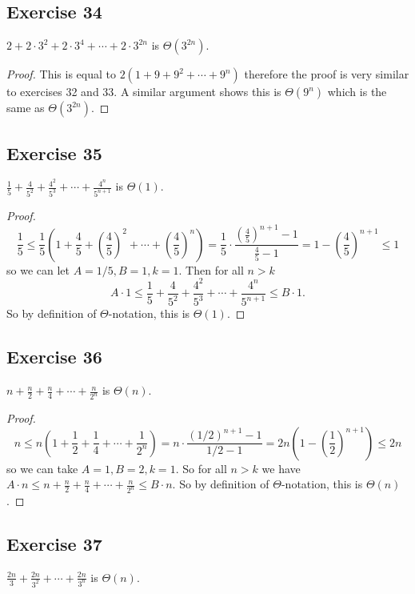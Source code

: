 \documentclass[14pt]{extarticle}
\newcommand{\dps}{\displaystyle}
\begin{document}
\subsection{Exercise 34}
\(2 + 2 \cdot 3^2 + 2 \cdot 3^4 + \cdots + 2 \cdot 3^{2n}\) is \(\Theta(3^{2n})\).

\begin{proof}
    This is equal to \(2(1 + 9 + 9^2 + \cdots + 9^n)\) therefore the proof is very similar to exercises 32 and 33. A similar
    argument shows this is \(\Theta(9^n)\) which is the same as \(\Theta(3^{2n})\).
\end{proof}

\subsection{Exercise 35}
\(\dps \frac{1}{5} + \frac{4}{5^2} + \frac{4^2}{5^3} + \cdots + \frac{4^n}{5^{n+1}}\) is \(\Theta(1)\).

\begin{proof}
    \[
        \frac{1}{5} \leq \frac{1}{5}\left(1 + \frac{4}{5}+ \left( \frac{4}{5}\right)^2 + \cdots + \left(\frac{4}{5}\right)^n
        \right) = \frac{1}{5} \cdot \frac{\left(\frac{4}{5}\right)^{n+1} - 1}{\frac{4}{5} - 1} = 1 - \left(\frac{4}{5}
        \right)^{n+1} \leq 1
    \]
    so we can let \(A = 1/5, B = 1, k = 1\). Then for all \(n > k\)
    \[
        A \cdot 1 \leq \frac{1}{5} + \frac{4}{5^2} + \frac{4^2}{5^3} + \cdots + \frac{4^n}{5^{n+1}} \leq B \cdot 1.
    \]
    So by definition of \(\Theta\)-notation, this is \(\Theta(1)\).
\end{proof}

\subsection{Exercise 36}
\(\dps n + \frac{n}{2} + \frac{n}{4} + \cdots + \frac{n}{2^n}\) is \(\Theta(n)\).

\begin{proof}
    \[
        n \leq n\left(1 + \frac{1}{2} + \frac{1}{4} + \cdots + \frac{1}{2^n}\right) = n \cdot \frac{(1/2)^{n+1} - 1}{1/2 - 1}
        = 2n \left(1 - \left(\frac{1}{2}\right)^{n+1}\right) \leq 2n
    \]
    so we can take \(A = 1, B = 2, k = 1\). So for all \(n > k\) we have \(\dps A \cdot n \leq n + \frac{n}{2} + \frac{n}{4} +
    \cdots + \frac{n}{2^n} \leq B \cdot n\). So by definition of \(\Theta\)-notation, this is \(\Theta(n)\).
\end{proof}

\subsection{Exercise 37}
\(\dps \frac{2n}{3} + \frac{2n}{3^2} + \cdots + \frac{2n}{3^n}\) is \(\Theta(n)\).
\end{document}
